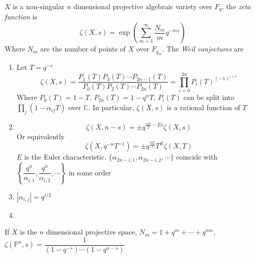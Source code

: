 \documentclass[main]{subfiles}
\begin{document}
\begin{definition}
$X$ is a non-singular $n$ dimensional projective algebraic variety over $F_q$, the \textit{zeta function} is
\[\zeta(X,s)=\exp\left(\sum_{m=1}^\infty\frac{N_m}{m}q^{-ms}\right)\]
Where $N_m$ are the number of points of $X$ over $F_{q_m}$. The \textit{Weil conjectures} are
\begin{enumerate}[leftmargin=*,label=\textbf{\arabic*.}]
\item Let $T=q^{-s}$
\[\zeta(X,s)=\frac{P_1(T)P_3(T)\cdots P_{2n-1}(T)}{P_0(T)P_2(T)\cdots P_{2n}(T)}=\prod_{i=0}^{2n}P_i(T)^{(-1)^{i+1}}\]
Where $P_0(T)=1-T$, $P_{2n}(T)=1-q^nT$, $P_i(T)$ can be split into $\prod_j(1-\alpha_{ij}T)$ over $\mathbb C$. In particular, $\zeta(X,s)$ is a rational function of $T$
\item
\[\zeta(X,n-s)=\pm q^{\frac{nE}{2}-Es}\zeta(X,s)\]
Or equivalently
\[\zeta(X,q^{-n}T^{-1})=\pm q^{\frac{nE}{2}}T^E\zeta(X,T)\]
$E$ is the Euler characteristic. $\{\alpha_{2n-i,1},\alpha_{2n-i,2},\cdots\}$ coincide with $\left\{\dfrac{q^n}{\alpha_{i,1}},\dfrac{q^n}{\alpha_{i,2}},\cdots\right\}$ in some order
\item $|\alpha_{i,j}|=q^{i/2}$
\item 
\end{enumerate}
\end{definition}

\begin{example}
If $X$ is the $n$ dimensional projective space, $N_m=1+q^m+\cdots+q^{nm}$, $\zeta(\mathbb P^n,s)=\dfrac{1}{(1-q^{-s})\cdots(1-q^{n-s})}$
\end{example}
\end{document}
